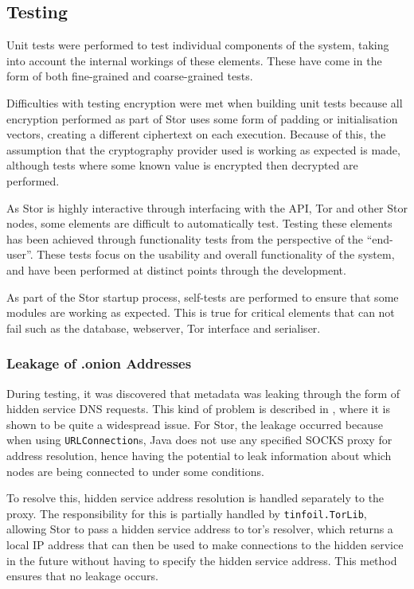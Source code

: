 	\subsection{Testing}
		Unit tests were performed to test individual components of the system, taking into account the internal workings of these elements. These have come in the form of both fine-grained and coarse-grained tests.
	
		Difficulties with testing encryption were met when building unit tests because all encryption performed as part of Stor uses some form of padding or initialisation vectors, creating a different ciphertext on each execution. Because of this, the assumption that the cryptography provider used is working as expected is made, although tests where some known value is encrypted then decrypted are performed.
		
		As Stor is highly interactive through interfacing with the API, Tor and other Stor nodes, some elements are difficult to automatically test. Testing these elements has been achieved through functionality tests from the perspective of the ``end-user''. These tests focus on the usability and overall functionality of the system, and have been performed at distinct points through the development.
		
		As part of the Stor startup process, self-tests are performed to ensure that some modules are working as expected. This is true for critical elements that can not fail such as the database, webserver, Tor interface and serialiser. 
		
		\subsubsection*{Leakage of .onion Addresses}
			During testing, it was discovered that metadata was leaking through the form of hidden service DNS requests. This kind of problem is described in \cite{Thomas:2014:MLO:2665943.2665951}, where it is shown to be quite a widespread issue. For Stor, the leakage occurred because when using \texttt{URLConnection}s, Java does not use any specified SOCKS proxy for address resolution, hence having the potential to leak information about which nodes are being connected to under some conditions.
			
			To resolve this, hidden service address resolution is handled separately to the proxy. The responsibility for this is partially handled by \texttt{tinfoil.TorLib}, allowing Stor to pass a hidden service address to tor's resolver, which returns a local IP address that can then be used to make connections to the hidden service in the future without having to specify the hidden service address. This method ensures that no leakage occurs.